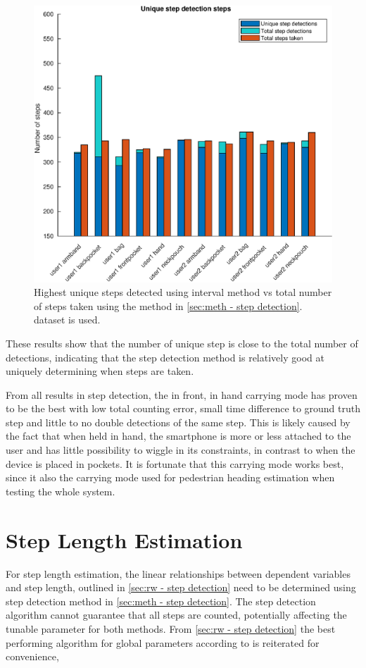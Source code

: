 \begin{figure}[H]
	\centering
	\includegraphics[width=0.7\linewidth]{images/20201127_1626_Unique_step_detection_steps}
	\setlength{\belowcaptionskip}{-10pt}
\caption[False positives and true positives step detection comparison]{Highest unique steps detected using interval method vs total number of steps taken using the method in \cref{sec:meth - step detection}. \citet{Brajdic2013} dataset is used. }
\label{fig:sd_tp_fp_comparison}
\end{figure}

These results show that the number of unique step is close to the total number of detections, indicating that the step detection method is relatively good at uniquely determining when steps are taken. \par 

From all results in step detection, the in front, in hand carrying mode has proven to be the best with low total counting error, small time difference to ground truth step and little to no double detections of the same step. This is likely caused by the fact that when held in hand, the smartphone is more or less attached to the user and has little possibility to wiggle in its constraints, in contrast to when the device is placed in pockets. It is fortunate that this carrying mode works best, since it also the carrying mode used for pedestrian heading estimation when testing the whole system.

\section{Step Length Estimation}
\label{sec:results-step_length_estimation}
For step length estimation, the linear relationships between dependent variables and step length, outlined in \cref{sec:rw - step detection} need to be determined using step detection method in \cref{sec:meth - step detection}. The step detection algorithm cannot guarantee that all steps are counted, potentially affecting the tunable parameter for both methods.  From \cref{sec:rw - step detection} the best performing algorithm for global parameters according to \cite{Vezocnik2019} is reiterated for convenience,

